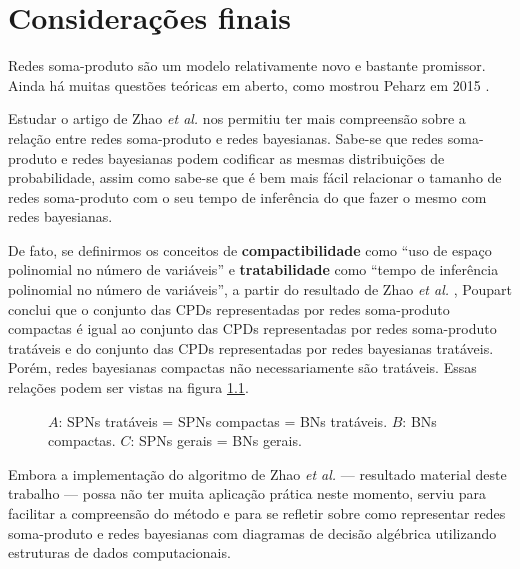 \chapter{Considerações finais}
\label{cap:conclusao}

Redes soma-produto são um modelo relativamente novo e bastante promissor. Ainda há muitas questões teóricas em aberto, como mostrou Peharz em 2015 \cite{Peharz2015}.

Estudar o artigo de Zhao \emph{et al.} \cite{Zhao2015} nos permitiu ter mais compreensão sobre a relação entre redes soma-produto e redes bayesianas. Sabe-se que redes soma-produto e redes bayesianas podem codificar as mesmas distribuições de probabilidade, assim como sabe-se que é bem mais fácil relacionar o tamanho de redes soma-produto com o seu tempo de inferência do que fazer o mesmo com redes bayesianas.

De fato, se definirmos os conceitos de \textbf{compactibilidade} como ``uso de espaço polinomial no número de variáveis'' e \textbf{tratabilidade} como ``tempo de inferência polinomial no número de variáveis'', a partir do resultado de Zhao \emph{et al.} \cite{Zhao2015}, Poupart \cite{Poupart2017} conclui que o conjunto das CPDs representadas por redes soma-produto compactas é igual ao conjunto das CPDs representadas por redes soma-produto tratáveis e do conjunto das CPDs representadas por redes bayesianas tratáveis. Porém, redes bayesianas compactas não necessariamente são tratáveis. Essas relações podem ser vistas na figura \ref{fig:poupart}.

\begin{figure}[h]

  \vspace{1em}

  \caption{
    \color{Red} $A$: SPNs tratáveis = SPNs compactas = BNs tratáveis.
    \color{Blue} $B$: BNs compactas.
    \color{Green} $C$: SPNs gerais = BNs gerais.
  }

  \label{fig:poupart}
\end{figure}

Embora a implementação do algoritmo de Zhao \emph{et al.} \cite{Zhao2015} --- resultado material deste trabalho --- possa não ter muita aplicação prática neste momento, serviu para facilitar a compreensão do método e para se refletir sobre como representar redes soma-produto e redes bayesianas com diagramas de decisão algébrica utilizando estruturas de dados computacionais.
